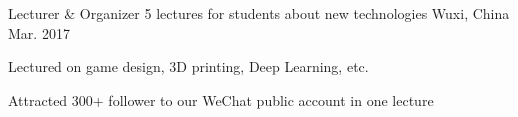 \begin{cventries}
  \cventry
    {Lecturer \& Organizer}
    {5 lectures for students about new technologies}
    {Wuxi, China}
    {Mar. 2017}
    {
      \begin{cvitems}
        \item {Lectured on game design, 3D printing, Deep Learning, etc.}
        \item {Attracted 300+ follower to our WeChat public account in one lecture}
      \end{cvitems}
    }
\end{cventries}
